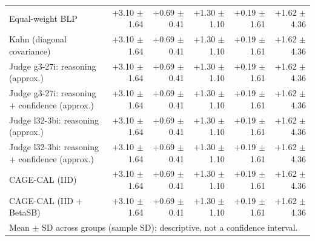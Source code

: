 \begin{tabular}{lrrrrr}
Equal-weight BLP & +3.10 {\scriptsize $\pm$ 1.64} & +0.69 {\scriptsize $\pm$ 0.41} & +1.30 {\scriptsize $\pm$ 1.10} & +0.19 {\scriptsize $\pm$ 1.61} & +1.62 {\scriptsize $\pm$ 4.36} \\
Kahn (diagonal covariance) & +3.10 {\scriptsize $\pm$ 1.64} & +0.69 {\scriptsize $\pm$ 0.41} & +1.30 {\scriptsize $\pm$ 1.10} & +0.19 {\scriptsize $\pm$ 1.61} & +1.62 {\scriptsize $\pm$ 4.36} \\
Judge g3-27i: reasoning (approx.) & +3.10 {\scriptsize $\pm$ 1.64} & +0.69 {\scriptsize $\pm$ 0.41} & +1.30 {\scriptsize $\pm$ 1.10} & +0.19 {\scriptsize $\pm$ 1.61} & +1.62 {\scriptsize $\pm$ 4.36} \\
Judge g3-27i: reasoning + confidence (approx.) & +3.10 {\scriptsize $\pm$ 1.64} & +0.69 {\scriptsize $\pm$ 0.41} & +1.30 {\scriptsize $\pm$ 1.10} & +0.19 {\scriptsize $\pm$ 1.61} & +1.62 {\scriptsize $\pm$ 4.36} \\
Judge l32-3bi: reasoning (approx.) & +3.10 {\scriptsize $\pm$ 1.64} & +0.69 {\scriptsize $\pm$ 0.41} & +1.30 {\scriptsize $\pm$ 1.10} & +0.19 {\scriptsize $\pm$ 1.61} & +1.62 {\scriptsize $\pm$ 4.36} \\
Judge l32-3bi: reasoning + confidence (approx.) & +3.10 {\scriptsize $\pm$ 1.64} & +0.69 {\scriptsize $\pm$ 0.41} & +1.30 {\scriptsize $\pm$ 1.10} & +0.19 {\scriptsize $\pm$ 1.61} & +1.62 {\scriptsize $\pm$ 4.36} \\
CAGE-CAL (IID) & +3.10 {\scriptsize $\pm$ 1.64} & +0.69 {\scriptsize $\pm$ 0.41} & +1.30 {\scriptsize $\pm$ 1.10} & +0.19 {\scriptsize $\pm$ 1.61} & +1.62 {\scriptsize $\pm$ 4.36} \\
CAGE-CAL (IID + BetaSB) & +3.10 {\scriptsize $\pm$ 1.64} & +0.69 {\scriptsize $\pm$ 0.41} & +1.30 {\scriptsize $\pm$ 1.10} & +0.19 {\scriptsize $\pm$ 1.61} & +1.62 {\scriptsize $\pm$ 4.36} \\
\bottomrule
\multicolumn{6}{l}{\scriptsize Mean $\pm$ SD across groups (sample SD); descriptive, not a confidence interval.} \\
\end{tabular}
